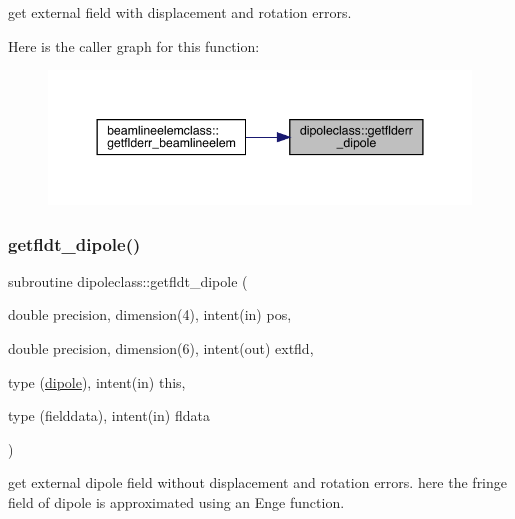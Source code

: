 get external field with displacement and rotation errors. 

Here is the caller graph for this function\+:\nopagebreak
\begin{figure}[H]
\begin{center}
\leavevmode
\includegraphics[width=344pt]{namespacedipoleclass_a0a75204835a2e4dd1ea67c1ee32e62fe_icgraph}
\end{center}
\end{figure}
\mbox{\label{namespacedipoleclass_af86cd228552505ad1c64928bb918f500}} 
\subsubsection{\texorpdfstring{getfldt\_dipole()}{getfldt\_dipole()}}
{\footnotesize\ttfamily subroutine dipoleclass\+::getfldt\+\_\+dipole (\begin{DoxyParamCaption}\item[{double precision, dimension(4), intent(in)}]{pos,  }\item[{double precision, dimension(6), intent(out)}]{extfld,  }\item[{type (\mbox{\hyperlink{namespacedipoleclass_structdipoleclass_1_1dipole}{dipole}}), intent(in)}]{this,  }\item[{type (fielddata), intent(in)}]{fldata }\end{DoxyParamCaption})}



get external dipole field without displacement and rotation errors. here the fringe field of dipole is approximated using an Enge function. 

